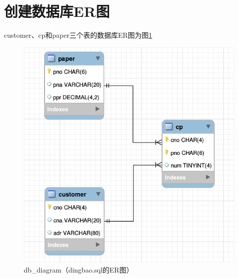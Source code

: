 \documentclass[hyperref,UTF8,c5size]{ctexart}
\begin{document}
\section{创建数据库ER图}
    customer、cp和paper三个表的数据库ER图为图\ref{fig:ER}
    \begin{figure}[H]
        \centering
        \includegraphics[scale=0.35]{db_diagram.png}
        \caption{db\_diagram（dingbao.sql的ER图）}
        \label{fig:ER}
    \end{figure}
\end{document}
